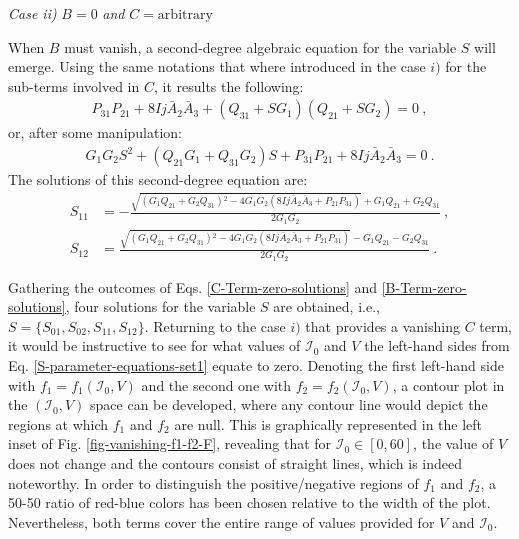 \textit{Case ii)} $B=0$ \textit{and} $C=\text{arbitrary}$

When $B$ must vanish, a second-degree algebraic equation for the variable $S$ will emerge. Using the same notations that where introduced in the case $i)$ for the sub-terms involved in $C$, it results the following:
\begin{align}
    P_{31}P_{21}+8Ij\bar{A}_2\bar{A}_3+\left(Q_{31}+SG_1\right)\left(Q_{21}+SG_2\right)=0\ , \nonumber
\end{align}
or, after some manipulation:
\begin{align}
    G_1G_2S^2+\left(Q_{21}G_1+Q_{31}G_2\right)S+P_{31}P_{21}+8Ij\bar{A}_2\bar{A}_3=0\ .
    \label{S-parameter-equations-set2}
\end{align}
The solutions of this second-degree equation are:
\begin{align}
    S_{11}&=-\frac{\sqrt{\left(G_1 Q_{21}+G_2 Q_{31}\right){}^2-4 G_1 G_2 \left(8 I j \bar{A}_2 \bar{A}_3+P_{21} P_{31}\right)}+G_1 Q_{21}+G_2 Q_{31}}{2 G_1 G_2}\ ,\nonumber\\
    S_{12}&=\frac{\sqrt{\left(G_1 Q_{21}+G_2 Q_{31}\right){}^2-4 G_1 G_2 \left(8 I j \bar{A}_2 \bar{A}_3+P_{21} P_{31}\right)}-G_1 Q_{21}-G_2 Q_{31}}{2 G_1 G_2}\ .
    \label{B-Term-zero-solutions}
\end{align}

Gathering the outcomes of Eqs. \ref{C-Term-zero-solutions} and \ref{B-Term-zero-solutions}, four solutions for the variable $S$ are obtained, i.e., $S=\{S_{01},S_{02},S_{11},S_{12}\}$. Returning to the case $i)$ that provides a vanishing $C$ term, it would be instructive to see for what values of $\mathcal{I}_0$ and $V$ the left-hand sides from Eq. \ref{S-parameter-equations-set1} equate to zero. Denoting the first left-hand side with $f_1=f_1(\mathcal{I}_0,V)$ and the second one with $f_2=f_2(\mathcal{I}_0,V)$, a contour plot in the $(\mathcal{I}_0,V)$ space can be developed, where any contour line would depict the regions at which $f_1$ and $f_2$ are null. This is graphically represented in the left inset of Fig. \ref{fig-vanishing-f1-f2-F}, revealing that for $\mathcal{I}_0\in[0,60]$, the value of $V$ does not change and the contours consist of straight lines, which is indeed noteworthy. In order to distinguish the positive/negative regions of $f_1$ and $f_2$, a 50-50 ratio of red-blue colors has been chosen relative to the width of the plot. Nevertheless, both terms cover the entire range of values provided for $V$ and $\mathcal{I}_0$.

